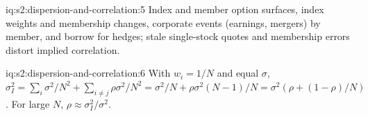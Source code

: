 \begin{solution}{iq:s2:dispersion-and-correlation:5}
Index and member option surfaces, index weights and membership changes, corporate events (earnings, mergers) by member, and borrow for hedges; stale
single-stock quotes and membership errors distort implied correlation.
\end{solution}

\begin{solution}{iq:s2:dispersion-and-correlation:6}
With $w_i = 1/N$ and equal $\sigma$, $\sigma_I^2 = \sum_i\sigma^2/N^2 + \sum_{i \ne j}\rho\sigma^2/N^2 = \sigma^2/N + \rho\sigma^2(N - 1)/N = \sigma^2(\rho +
(1 - \rho)/N)$. For large $N$, $\rho \approx \sigma_I^2/\sigma^2$.
\end{solution}
